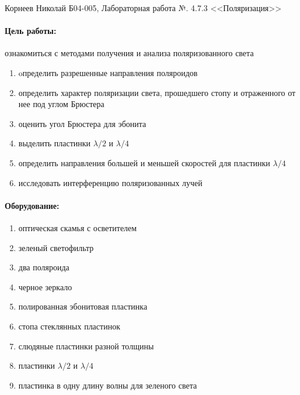 \documentclass[a4paper,12pt]{article}
\author{Бичина Марина 
группа Б04-005 1 курса ФЭФМ}
\title{}
\date{}
\begin{document}

\begin{center}
\begin{Large}
{Корнеев Николай Б04-005, Лабораторная работа №. 4.7.3 <<Поляризация>>}
\end{Large}
\end{center}
\paragraph{Цель работы:} 
ознакомиться с методами получения и анализа поляризованного света
\begin{enumerate}
\itemsep0em
\item oпределить разрешенные направления поляроидов
\item определить характер поляризации света, прошедшего стопу и отраженного от нее под углом Брюстера
\item оценить угол Брюстера для эбонита
\item выделить пластинки $\lambda/2$ и $\lambda/4$
\item определить направления большей и меньшей скоростей для пластинки $\lambda/4$
\item исследовать интерференцию поляризованных лучей
\end{enumerate}
\paragraph{Оборудование:}
\begin{enumerate}
\itemsep0em
\item оптическая скамья с осветителем
\item зеленый светофильтр
\item два поляроида
\item черное зеркало
\item полированная эбонитовая пластинка
\item стопа стеклянных пластинок
\item слюдяные пластинки разной толщины
\item пластинки $\lambda/2$ и $\lambda/4$
\item пластинка в одну длину волны для зеленого света
\end{enumerate}
\end{document}

